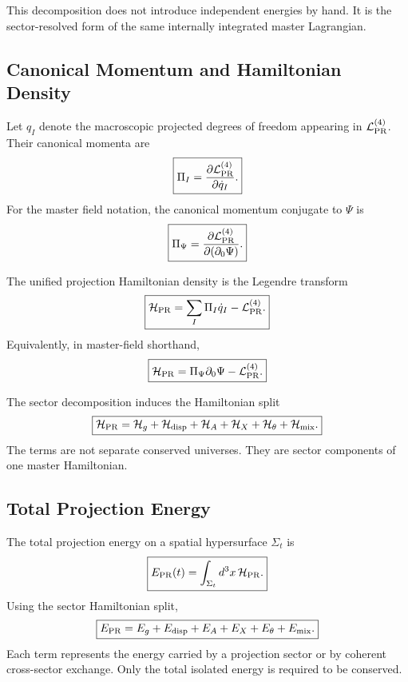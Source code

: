 \documentclass[11pt]{article}
\begin{document}
This decomposition does not introduce independent energies by hand. It is the
sector-resolved form of the same internally integrated master Lagrangian.

\subsection{Canonical Momentum and Hamiltonian Density}

Let \(q_I\) denote the macroscopic projected degrees of freedom appearing in
\(\mathcal L_{\rm PR}^{(4)}\). Their canonical momenta are
\begin{equation}
\boxed{
\Pi_I
=
\frac{\partial\mathcal L_{\rm PR}^{(4)}}{\partial\dot q_I}.
}
\end{equation}
For the master field notation, the canonical momentum conjugate to \(\Psi\) is
\begin{equation}
\boxed{
\Pi_\Psi
=
\frac{\partial\mathcal L_{\rm PR}^{(4)}}{\partial(\partial_0\Psi)}.
}
\end{equation}

The unified projection Hamiltonian density is the Legendre transform
\begin{equation}
\boxed{
\mathcal H_{\rm PR}
=
\sum_I
\Pi_I\dot q_I
-
\mathcal L_{\rm PR}^{(4)}.
}
\end{equation}
Equivalently, in master-field shorthand,
\begin{equation}
\boxed{
\mathcal H_{\rm PR}
=
\Pi_\Psi\partial_0\Psi
-
\mathcal L_{\rm PR}^{(4)}.
}
\end{equation}

The sector decomposition induces the Hamiltonian split
\begin{equation}
\boxed{
\mathcal H_{\rm PR}
=
\mathcal H_g
+
\mathcal H_{\rm disp}
+
\mathcal H_A
+
\mathcal H_X
+
\mathcal H_\theta
+
\mathcal H_{\rm mix}.
}
\end{equation}
The terms are not separate conserved universes. They are sector components of
one master Hamiltonian.

\subsection{Total Projection Energy}

The total projection energy on a spatial hypersurface \(\Sigma_t\) is
\begin{equation}
\boxed{
E_{\rm PR}(t)
=
\int_{\Sigma_t}
d^3x\,
\mathcal H_{\rm PR}.
}
\end{equation}
Using the sector Hamiltonian split,
\begin{equation}
\boxed{
E_{\rm PR}
=
E_g
+
E_{\rm disp}
+
E_A
+
E_X
+
E_\theta
+
E_{\rm mix}.
}
\end{equation}
Each term represents the energy carried by a projection sector or by coherent
cross-sector exchange. Only the total isolated energy is required to be
conserved.
\end{document}
